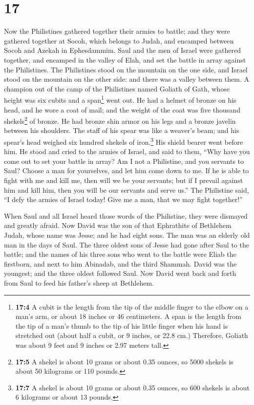 \hypertarget{section-16}{%
\section{17}\label{section-16}}

 Now the Philistines gathered together their armies to
battle; and they were gathered together at Socoh, which belongs to
Judah, and encamped between Socoh and Azekah in Ephesdammim.
 Saul and the men of Israel were gathered together, and
encamped in the valley of Elah, and set the battle in array against the
Philistines.  The Philistines stood on the mountain on the
one side, and Israel stood on the mountain on the other side: and there
was a valley between them.  A champion out of the camp of
the Philistines named Goliath of Gath, whose height was six cubits and a
span\footnote{\textbf{17:4} A cubit is the length from the tip of the
  middle finger to the elbow on a man's arm, or about 18 inches or 46
  centimeters. A span is the length from the tip of a man's thumb to the
  tip of his little finger when his hand is stretched out (about half a
  cubit, or 9 inches, or 22.8 cm.) Therefore, Goliath was about 9 feet
  and 9 inches or 2.97 meters tall.} went out.  He had a
helmet of bronze on his head, and he wore a coat of mail; and the weight
of the coat was five thousand shekels\footnote{\textbf{17:5} A shekel is
  about 10 grams or about 0.35 ounces, so 5000 shekels is about 50
  kilograms or 110 pounds.} of bronze.  He had bronze shin
armor on his legs and a bronze javelin between his shoulders.
 The staff of his spear was like a weaver's beam; and his
spear's head weighed six hundred shekels of iron.\footnote{\textbf{17:7}
  A shekel is about 10 grams or about 0.35 ounces, so 600 shekels is
  about 6 kilograms or about 13 pounds.} His shield bearer went before
him.  He stood and cried to the armies of Israel, and said
to them, ``Why have you come out to set your battle in array? Am I not a
Philistine, and you servants to Saul? Choose a man for yourselves, and
let him come down to me.  If he is able to fight with me
and kill me, then will we be your servants; but if I prevail against him
and kill him, then you will be our servants and serve us.''
 The Philistine said, ``I defy the armies of Israel
today! Give me a man, that we may fight together!''

 When Saul and all Israel heard those words of the
Philistine, they were dismayed and greatly afraid.  Now
David was the son of that Ephrathite of Bethlehem Judah, whose name was
Jesse; and he had eight sons. The man was an elderly old man in the days
of Saul.  The three oldest sons of Jesse had gone after
Saul to the battle; and the names of his three sons who went to the
battle were Eliab the firstborn, and next to him Abinadab, and the third
Shammah.  David was the youngest; and the three oldest
followed Saul.  Now David went back and forth from Saul
to feed his father's sheep at Bethlehem.


